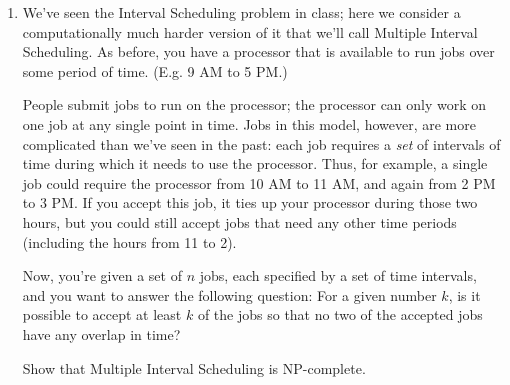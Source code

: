 \documentclass[12pt]{article}
\begin{document}
\begin{enumerate}

\item 

We've seen the
Interval Scheduling problem in class;
here we consider a computationally much harder version of it that we'll call
{\sc Multiple Interval Scheduling}.
As before, you have a processor that is available to
run jobs over some period of time.
(E.g. 9 AM to 5 PM.)

People submit jobs to run on the processor;
the processor can only work on one job at any single point in time.
Jobs in this model, however, are more complicated than we've seen in the past:
each job requires a {\em set} of intervals of time
during which it needs to use the processor.
Thus, for example, a single job could require
the processor from 10 AM to 11 AM, and again from 2 PM to 3 PM.
If you accept this job, it ties up your processor during
those two hours, but you could still accept jobs that
need any other time periods (including the hours from 11 to 2).

Now, you're given a set of $n$ jobs, each specified by
a set of time intervals, and you want to
answer the following question:
For a given number $k$, is it possible to accept
at least $k$ of the jobs so that no two of the accepted
jobs have any overlap in time?

Show that {\sc Multiple Interval Scheduling}
is NP-complete.

\end{enumerate}
\end{document}

